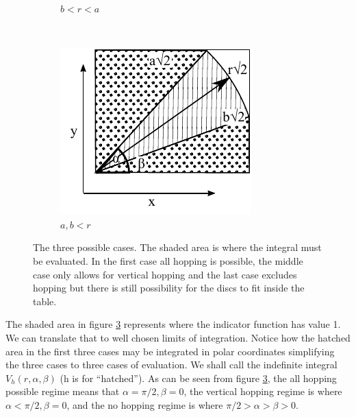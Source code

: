 \documentclass[superscriptaddress,pre,reprint,showpacs,onecolumn]{revtex4-1}
\begin{document}
\begin{figure}[h]
\begin{subfigure}[b]{0.32\textwidth}
          \caption{$b<r<a$}
          \label{Caso2}
        \end{subfigure}%
        ~ %
        \begin{subfigure}[b]{0.32\textwidth}
          \centering
          \includegraphics[width=\textwidth]{figures/DiagramaIntegraCaso3.pdf}
          \caption{$a,b<r$}
          \label{Caso3}
        \end{subfigure}%
        \caption{The three possible cases. The shaded area is where the integral
          must be evaluated. In the first case all hopping is possible, the middle case
          only allows for vertical hopping and the last case excludes hopping but there
        is still possibility for the discs to fit inside the table.}
\label{CasosIntegra}
\end{figure}
The shaded area in figure \ref{CasosIntegra} represents where the indicator function
has value 1. We can translate that to well chosen limits of integration. Notice
how the hatched area in the first three cases may be integrated in polar coordinates
simplifying the three cases to three cases of evaluation. We shall call the
indefinite integral $V_h(r,\alpha,\beta)$ (h is for ``hatched'').
As can be seen from figure \ref{CasosIntegra}, the all hopping possible regime
means that $\alpha = \pi/2, \beta=0$, the vertical hopping regime is where
$\alpha < \pi/2, \beta=0$, and the no hopping regime is where $\pi/2 > \alpha > \beta > 0$.
\end{document}
